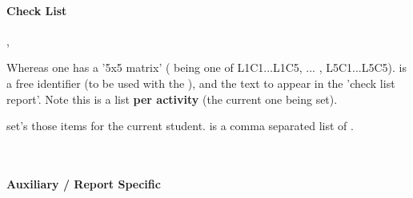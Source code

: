 \documentclass[article,nogeometry,english,tocdepth=3,secdepth=3]{ufrgscca} %
\begin{document}
\paragraph{Check List}
\begin{codedescribe}[code,update=2023/11/18]{\checkdef,\checklist}%
\begin{codesyntax}%
\end{codesyntax}
Whereas one has a '5x5 matrix' ( being one of L1C1...L1C5, ... , L5C1...L5C5).  is a free identifier (to be used with the \tsmacro{\checklist}{}), and  the text to appear in the 'check list report'.  Note this is a list \textbf{per activity} (the current one being set).

\tsmacro{\checklist}{} set's those items for the current student.  is a comma separated list of .

\begin{codestore}[st=d.check]


\end{codestore}



\end{codedescribe}\\


\paragraph{Auxiliary / Report Specific}
\end{document}
